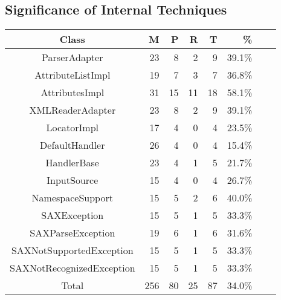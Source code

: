 \subsection{Significance of Internal Techniques}
\label{sec:evaluation:techniques}
\begin{table}[t]
\centering
\begin{SmallOut}
\begin {tabular} {|c|r|r|r|r|r|c|c|}
 \hline
\textbf{Class}& \textbf{M} & \textbf{P} & \textbf{R}
& \textbf{T} & \textbf{\%} \\
\hline
ParserAdapter                  &  23 &  8   & 2    &  9 & 39.1\%\\
\hline
AttributeListImpl              &  19 &  7   & 3    & 7  & 36.8\%\\
\hline
AttributesImpl                 &  31 & 15  & 11    &  18 & 58.1\%\\
\hline
XMLReaderAdapter               &  23 & 8    & 2    &  9 & 39.1\%\\
\hline
LocatorImpl                    &  17 & 4    & 0    &  4 & 23.5\%\\
\hline
DefaultHandler                 &  26 & 4    & 0    &  4 & 15.4\%\\
\hline
HandlerBase                    &  23 & 4   & 1    &  5 & 21.7\%\\
\hline
InputSource                    &  15 & 4   & 0    &  4 & 26.7\%\\
\hline
NamespaceSupport               &  15  & 5   & 2    &  6 & 40.0\%\\
\hline
SAXException                   &  15 & 5    & 1    &  5 & 33.3\%\\
\hline
SAXParseException              &  19 & 6   & 1    &  6 & 31.6\%\\
\hline
SAXNotSupportedException       &  15 & 5   & 1    &  5 & 33.3\%\\
\hline
SAXNotRecognizedException      &  15 & 5   & 1    &  5 & 33.3\%\\
\hline
Total                          &  256& 80  & 25   &  87 & 34.0\%\\
\hline
\end{tabular}\vspace*{-2ex}
 \label{table:techniques}
\end{SmallOut}\vspace*{-4ex}
\end{table}
